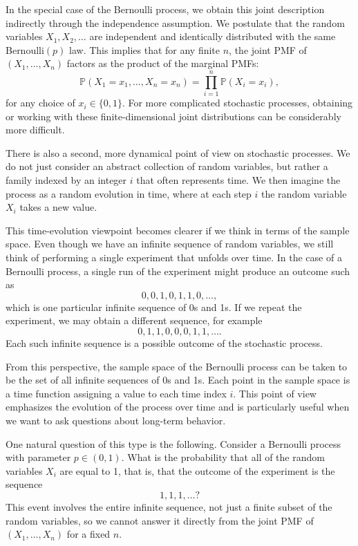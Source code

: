 In the special case of the Bernoulli process, we obtain this joint description indirectly through the independence assumption.  
We postulate that the random variables \(X_1, X_2, \ldots\) are independent and identically distributed with the same Bernoulli\((p)\) law.  
This implies that for any finite \(n\), the joint PMF of \((X_1,\ldots,X_n)\) factors as the product of the marginal PMFs:
\[
\mathbb{P}(X_1 = x_1, \ldots, X_n = x_n)
=
\prod_{i=1}^{n} \mathbb{P}(X_i = x_i),
\]
for any choice of \(x_i \in \{0,1\}\).  
For more complicated stochastic processes, obtaining or working with these finite-dimensional joint distributions can be considerably more difficult.  

There is also a second, more dynamical point of view on stochastic processes.  
We do not just consider an abstract collection of random variables, but rather a family indexed by an integer \(i\) that often represents time.  
We then imagine the process as a random evolution in time, where at each step \(i\) the random variable \(X_i\) takes a new value.  

This time-evolution viewpoint becomes clearer if we think in terms of the sample space.  
Even though we have an infinite sequence of random variables, we still think of performing a single experiment that unfolds over time.  
In the case of a Bernoulli process, a single run of the experiment might produce an outcome such as
\[
0, 0, 1, 0, 1, 1, 0, \ldots,
\]
which is one particular infinite sequence of 0s and 1s.  
If we repeat the experiment, we may obtain a different sequence, for example
\[
0, 1, 1, 0, 0, 0, 1, 1, \ldots.
\]
Each such infinite sequence is a possible outcome of the stochastic process.  

From this perspective, the sample space of the Bernoulli process can be taken to be the set of all infinite sequences of 0s and 1s.  
Each point in the sample space is a time function assigning a value to each time index \(i\).  
This point of view emphasizes the evolution of the process over time and is particularly useful when we want to ask questions about long-term behavior.  

One natural question of this type is the following.  
Consider a Bernoulli process with parameter \(p \in (0,1)\).  
What is the probability that all of the random variables \(X_i\) are equal to 1, that is, that the outcome of the experiment is the sequence
\[
1,1,1,\ldots?
\]
This event involves the entire infinite sequence, not just a finite subset of the random variables, so we cannot answer it directly from the joint PMF of \((X_1,\ldots,X_n)\) for a fixed \(n\).  

